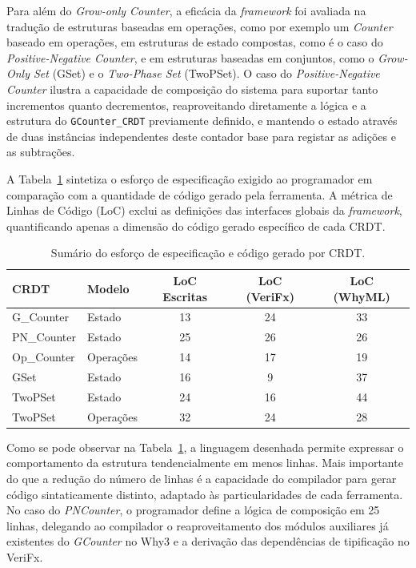 \documentclass{llncs}
\begin{document}
Para além do \textit{Grow-only Counter}, a eficácia da \textit{framework} foi avaliada na tradução de estruturas baseadas em operações,
como por exemplo um \textit{Counter} baseado em operações, em estruturas de estado compostas,
como é o caso do \textit{Positive-Negative Counter},
e em estruturas baseadas em conjuntos, como o \textit{Grow-Only Set} (GSet) e o \textit{Two-Phase Set} (TwoPSet).
O caso do \textit{Positive-Negative Counter} ilustra a capacidade de composição do sistema para suportar tanto incrementos quanto decrementos,
reaproveitando diretamente a lógica e a estrutura do \texttt{GCounter\_CRDT} previamente definido,
e mantendo o estado através de duas instâncias independentes deste contador base para registar as adições e as subtrações.

A Tabela~\ref{tab:loc} sintetiza o esforço de especificação exigido ao programador em comparação com a quantidade de código gerado pela ferramenta.
A métrica de Linhas de Código (LoC) exclui as definições das interfaces globais da \textit{framework},
quantificando apenas a dimensão do código gerado específico de cada CRDT.

\begin{table}[htbp]
    \centering
    \begin{tabular}{l | l | c | c | c}
        \textbf{CRDT} & \textbf{Modelo} & \textbf{LoC Escritas} & \textbf{LoC (VeriFx)} & \textbf{LoC (WhyML)} \\
        \hline
        G\_Counter  & Estado    & 13 & 24 & 33 \\
        PN\_Counter & Estado    & 25 & 26 & 26 \\
        Op\_Counter & Operações & 14 & 17 & 19 \\
        GSet        & Estado    & 16 & 9  & 37 \\
        TwoPSet     & Estado    & 24 & 16 & 44 \\
        TwoPSet     & Operações & 32 & 24 & 28 \\
    \end{tabular}
    \vspace{0.2cm}
    \caption{Sumário do esforço de especificação e código gerado por CRDT.}
    \label{tab:loc}
\end{table}

Como se pode observar na Tabela~\ref{tab:loc}, a linguagem desenhada permite expressar o comportamento da estrutura tendencialmente em menos linhas.
Mais importante do que a redução do número de linhas é a capacidade do compilador para gerar código sintaticamente distinto,
adaptado às particularidades de cada ferramenta. No caso do \textit{PNCounter}, o programador define a lógica de composição em 25 linhas,
delegando ao compilador o reaproveitamento dos módulos auxiliares já existentes do \textit{GCounter} no Why3 e a derivação das dependências de tipificação no VeriFx.
\end{document}
